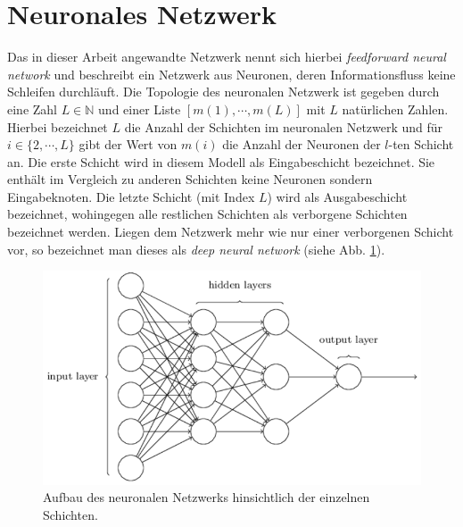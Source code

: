 \section{Neuronales Netzwerk}
Das in dieser Arbeit angewandte Netzwerk nennt sich hierbei \textit{feedforward neural network} und beschreibt ein Netzwerk aus Neuronen, deren Informationsfluss keine Schleifen durchläuft. Die Topologie des neuronalen Netzwerk ist gegeben durch eine Zahl $L \in \mathbb{N}$ und einer Liste $[m(1),\cdots ,m(L)]$ mit $L$ natürlichen Zahlen. Hierbei bezeichnet $L$ die Anzahl der Schichten im neuronalen Netzwerk und für $i \in \{2,\cdots ,L\}$ gibt der Wert von $m(i)$ die Anzahl der Neuronen der $l$-ten Schicht an. Die erste Schicht wird in diesem Modell als Eingabeschicht bezeichnet. Sie enthält im Vergleich zu anderen Schichten keine Neuronen sondern Eingabeknoten. Die letzte Schicht (mit Index $L$) wird als Ausgabeschicht bezeichnet, wohingegen alle restlichen Schichten als verborgene Schichten bezeichnet werden. Liegen dem Netzwerk mehr wie nur einer verborgenen Schicht vor, so bezeichnet man dieses als \textit{deep neural network} (siehe Abb. \ref{fig:neural_network_extended}).
\begin{figure}[hbt]
	\centering
	\includegraphics[scale=0.6]{Bilder/neural_network_extended}
	\caption{Aufbau des neuronalen Netzwerks hinsichtlich der einzelnen Schichten.} 
	\label{fig:neural_network_extended} 
\end{figure}

